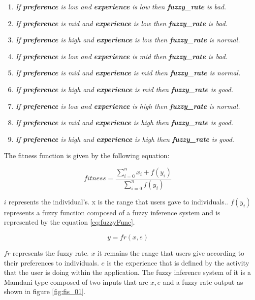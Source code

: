 \begin{enumerate}
	\item \textit{If \textbf{preference} is low and
		\textbf{experience} is low then \textbf{fuzzy\_rate} is bad.}
	\item \textit{If \textbf{preference} is mid and
		\textbf{experience} is low  then \textbf{fuzzy\_rate} is bad.}
	\item \textit{If \textbf{preference} is high and
		\textbf{experience} is low  then \textbf{fuzzy\_rate} is normal.}
	\item \textit{If \textbf{preference} is low and
		\textbf{experience} is mid then \textbf{fuzzy\_rate} is bad.}
	\item \textit{If \textbf{preference} is mid and
		\textbf{experience} is mid  then \textbf{fuzzy\_rate} is normal.}
	\item \textit{If \textbf{preference} is high and
		\textbf{experience} is mid  then \textbf{fuzzy\_rate} is good.}
	\item \textit{If \textbf{preference} is low and
		\textbf{experience} is high then \textbf{fuzzy\_rate} is normal.}
	\item \textit{If \textbf{preference} is mid and
		\textbf{experience} is high  then \textbf{fuzzy\_rate} is good.}
	\item \textit{If \textbf{preference} is high and
		\textbf{experience} is high  then \textbf{fuzzy\_rate} is good.}

\end{enumerate}

The fitness function is given by the following equation:

\begin{equation}\label{eq:fitfunc02}
\displaystyle fitness=\frac{\sum_{i=0}^{n}x_{i}+f(y_{i})}{\sum_{i=0}^{n}f(y_{i})}
\end{equation}

$i$ represents the individual's. x is the range that users gave to individuals..
$f(y_i)$ represents a fuzzy function composed of a fuzzy inference system and is
represented by the equation \ref{eq:fuzzyFunc}.

\begin{equation}\label{eq:fuzzyFunc}
\displaystyle y=fr(x,e)
\end{equation}


$fr$ represents the fuzzy rate.
$x$ it remains the range that users give according to their preferences to individuals.
$e$  is the experience that is defined by the
activity that the user is doing within the application. The fuzzy inference system of it is a Mamdani type composed of two inputs that are  $x,e$ and a fuzzy rate output as shown in figure \ref{fig:fis_01}.


